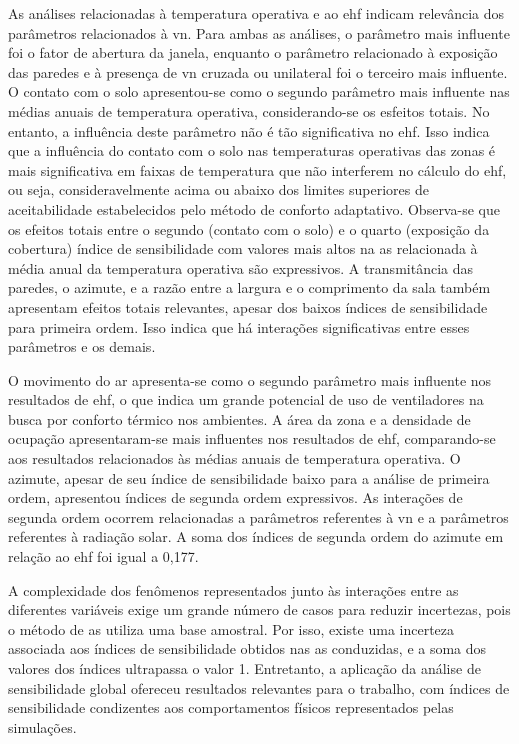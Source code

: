 \documentclass[brazil,hardcopy,openany]{ufscthesis} %
\begin{document}
As análises relacionadas à temperatura operativa e ao \acrshort{ehf} indicam relevância dos parâmetros relacionados à \acrshort{vn}. Para ambas as análises, o parâmetro mais influente foi o fator de abertura da janela, enquanto o parâmetro relacionado à exposição das paredes e à presença de \acrshort{vn} cruzada ou unilateral foi o terceiro mais influente. 
O contato com o solo apresentou-se como o segundo parâmetro mais influente nas médias anuais de temperatura operativa, considerando-se os esfeitos totais. No entanto, a influência deste parâmetro não é tão significativa no \acrshort{ehf}. Isso indica que a influência do contato com o solo nas temperaturas operativas das zonas é mais significativa em faixas de temperatura que não interferem no cálculo do \acrshort{ehf}, ou seja, consideravelmente acima ou abaixo dos limites superiores de aceitabilidade estabelecidos pelo método de conforto adaptativo.
Observa-se que os efeitos totais entre o segundo (contato com o solo) e o quarto (exposição da cobertura) índice de sensibilidade com valores mais altos na \acrshort{as} relacionada à média anual da temperatura operativa são expressivos.
A transmitância das paredes, o azimute, e a razão entre a largura e o comprimento da sala também apresentam efeitos totais relevantes, apesar dos baixos índices de sensibilidade para primeira ordem. Isso indica que há interações significativas entre esses parâmetros e os demais.

O movimento do ar apresenta-se como o segundo parâmetro mais influente nos resultados de \acrshort{ehf}, o que indica um grande potencial de uso de ventiladores na busca por conforto térmico nos ambientes. 
A área da zona e a densidade de ocupação apresentaram-se mais influentes nos resultados de \acrshort{ehf}, comparando-se aos resultados relacionados às médias anuais de temperatura operativa.
O azimute, apesar de seu índice de sensibilidade baixo para a análise de primeira ordem, apresentou índices de segunda ordem expressivos. As interações de segunda ordem ocorrem relacionadas a parâmetros referentes à \acrshort{vn} e a parâmetros referentes à radiação solar. A soma dos índices de segunda ordem do azimute em relação ao \acrshort{ehf} foi igual a 0,177.  %

A complexidade dos fenômenos representados junto às interações entre as diferentes variáveis exige um grande número de casos para reduzir incertezas, pois o método de \acrshort{as} utiliza uma base amostral. Por isso, existe uma incerteza associada aos índices de sensibilidade obtidos nas \acrshort{as} conduzidas, e a soma dos valores dos índices ultrapassa o valor 1. Entretanto, a aplicação da análise de sensibilidade global ofereceu resultados relevantes para o trabalho, com índices de sensibilidade condizentes aos comportamentos físicos representados pelas simulações. 
\end{document}
